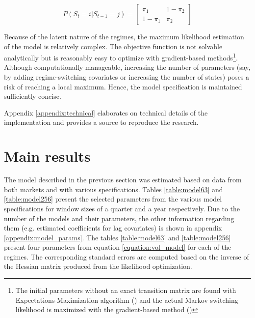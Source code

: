 \documentclass[12pt]{article}
\begin{document}
\begin{equation}
	P(S_t = i | S_{t-1} = j) = \begin{bmatrix}
		\pi_1 & 1 - \pi_2\\
		1 - \pi_1 & \pi_2
	\end{bmatrix}
\end{equation}

Because of the latent nature of the regimes, the maximum likelihood estimation of the model is relatively complex. The objective function is not solvable analytically but is reasonably easy to optimize with gradient-based methods\footnote{The initial parameters without an exact transition matrix are found with Expectations-Maximization algorithm (\citet{dempster77}) and the actual Markov switching likelihood is maximized with the gradient-based method (\citet{rowan90})}. Although computationally manageable, increasing the number of parameters (say, by adding regime-switching covariates or increasing the number of states) poses a risk of reaching a local maximum. Hence, the model specification is maintained sufficiently concise.

Appendix \ref{appendix:technical} elaborates on technical details of the implementation and provides a source to reproduce the research.

\section{Main results}\label{section:main_results}

The model described in the previous section was estimated based on data from both markets and with various specifications. Tables \ref{table:model63} and \ref{table:model256} present the selected parameters from the various model specifications for window sizes of a quarter and a year respectively. Due to the number of the models and their parameters, the other information regarding them (e.g. estimated coefficients for lag covariates) is shown in appendix \ref{appendix:model_params}. The tables \ref{table:model63} and \ref{table:model256} present four parameters from equation \ref{equation:vol_model} for each of the regimes. The corresponding standard errors are computed based on the inverse of the Hessian matrix produced from the likelihood optimization.
\end{document}
